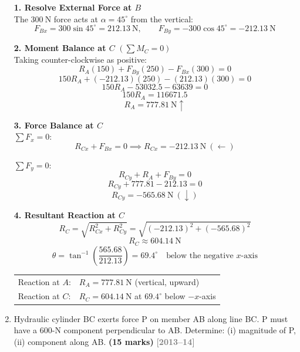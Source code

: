 \documentclass[12pt,a3paper]{article}
\newcommand{\yr}[1]{\hfill\textcolor{gray}{\small\textbf{[#1]}}}
\newcommand{\mk}[1]{\textcolor{orange!70!black}{\small\textbf{(#1 marks)}}}
\begin{document}
\begin{enumerate}
\begin{tcolorbox}[enhanced,breakable,ansbox,colback=cD!4,colframe=cD,
  boxrule=0.8pt,arc=5pt,
  title={\textbf{Solution}},fonttitle=\bfseries\color{white},
  colbacktitle=cD]

\textbf{1. Resolve External Force at $B$}\\[4pt]
The $300\ \text{N}$ force acts at $\alpha = 45^\circ$ from the vertical:
\[
  F_{Bx} = 300\sin45^\circ = 212.13\ \text{N}, \qquad
  F_{By} = -300\cos45^\circ = -212.13\ \text{N}
\]

\medskip
\textbf{2. Moment Balance at $C$} $\left(\sum M_C = 0\right)$\\[4pt]
Taking counter-clockwise as positive:
\[
  R_A(150) + F_{By}(250) - F_{Bx}(300) = 0
\]
\[
  150R_A + (-212.13)(250) - (212.13)(300) = 0
\]
\[
  150R_A - 53032.5 - 63639 = 0
\]
\[
  150R_A = 116671.5
\]
\[
  \boxed{R_A = 777.81\ \text{N} \uparrow}
\]

\medskip
\textbf{3. Force Balance at $C$}\\[4pt]

$\sum F_x = 0$:
\[
  R_{Cx} + F_{Bx} = 0 \implies R_{Cx} = -212.13\ \text{N}\ (\leftarrow)
\]

$\sum F_y = 0$:
\[
  R_{Cy} + R_A + F_{By} = 0
\]
\[
  R_{Cy} + 777.81 - 212.13 = 0
\]
\[
  R_{Cy} = -565.68\ \text{N}\ (\downarrow)
\]

\medskip
\textbf{4. Resultant Reaction at $C$}\\[4pt]
\[
  R_C = \sqrt{R_{Cx}^2 + R_{Cy}^2}
      = \sqrt{(-212.13)^2 + (-565.68)^2}
\]
\[
  \boxed{R_C \approx 604.14\ \text{N}}
\]
\[
  \theta = \tan^{-1}\!\left(\frac{565.68}{212.13}\right) = 69.4^\circ
  \quad \text{below the negative } x\text{-axis}
\]

\medskip
\begin{center}
\begin{tabular}{ll}
  Reaction at $A$: & $R_A = 777.81\ \text{N}$ (vertical, upward) \\[4pt]
  Reaction at $C$: & $R_C = 604.14\ \text{N}$ at $69.4^\circ$ below $-x$-axis
\end{tabular}
\end{center}

\end{tcolorbox}

\item \label{qlabel:B1-Q25}
Hydraulic cylinder BC exerts force P on member AB along line BC. P must have a 600-N component perpendicular to AB. Determine: (i) magnitude of P, (ii) component along AB. \mk{15}
\yr{2013--14}


\end{enumerate}
\end{document}
